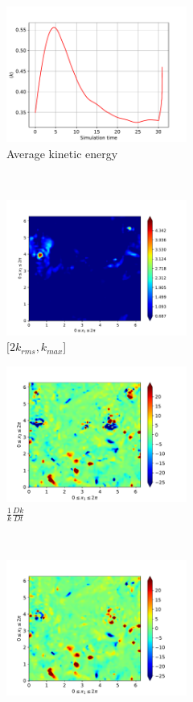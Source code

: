 \begin{figure}[H]
    \begin{subfigure}[H]{0.45\textwidth}
        \includegraphics[height=1.75in]{media/run-cds-65/ke-average1420}
        \caption{Average kinetic energy}
    \end{subfigure}
    ~
    \begin{subfigure}[H]{0.45\textwidth}
        \includegraphics[height=1.75in]{media/run-cds-65/ke-2-1420}
        \caption{$[2k_{rms}, k_{max} $] }
    \end{subfigure}
    \newline
    \begin{subfigure}[H]{0.45\textwidth}
        \includegraphics[height=1.75in]{media/run-cds-65/ke-1420}
        \caption{$\frac{1}{k} \frac{D k}{Dt}$}
    \end{subfigure}
    ~
    \begin{subfigure}{0.45\textwidth}
        \includegraphics[height=1.75in]{media/run-cds-65/A-ke-1420}

\end{subfigure}
\end{figure}
